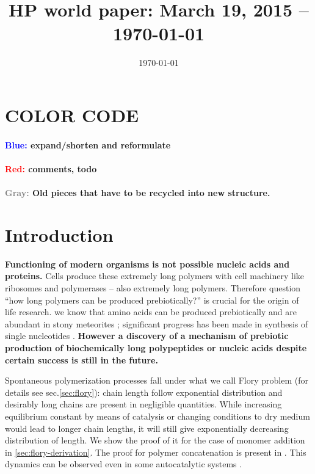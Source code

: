 \documentclass[12pt]{paper}
\title{HP world paper: March 19, 2015 -- \today}
\author{}
\date{\today}
\newcommand{\red}[1]{\textcolor{red}{#1}}
\newcommand{\gray}[1]{\textcolor{gray}{#1}}
\begin{document}
 \maketitle
 \tableofcontents
 
 \section*{COLOR CODE}
\paragraph{\textcolor{blue}{Blue: } expand/shorten and reformulate}
\paragraph{\red{Red: }comments, todo}
\paragraph{\gray{Gray: }Old pieces that have to be recycled into new structure.}
 
\section{Introduction} 

\textbf{Functioning of modern organisms is not possible nucleic 
acids and proteins.} Cells produce these extremely long polymers with cell machinery 
like ribosomes and polymerases -- also extremely long polymers. 
Therefore question ``how long 
polymers can be produced prebiotically?'' is crucial for the origin of life research.
we know that amino acids can be produced prebiotically \cite{Miller1953} and are abundant in 
stony meteorites \cite{Sephton2002}; significant progress has been made in synthesis of 
single nucleotides \cite{Powner2009a}. \textbf{However a discovery of a mechanism of prebiotic 
production of biochemically 
long polypeptides or nucleic acids despite certain success 
\cite{Shock1992,Martin1998,PAECHT-HOROWITZ1970,Lambert2008,Leman2004a,Orgel2004,Ferris1996} is 
still in the future.}

Spontaneous polymerization processes fall under what we call Flory problem (for details see 
sec.\ref{sec:flory}): chain length follow exponential distribution and desirably long chains are 
present in negligible quantities. While increasing equilibrium constant by means of catalysis or 
changing conditions to dry medium would lead to longer chain lengths, it will still give 
exponentially decreasing distribution of length. We show the proof of it for the case of monomer 
addition in \ref{sec:flory-derivation}. The proof for polymer concatenation is present in 
\cite{Derr2012}. This dynamics can be observed even in some autocatalytic systems \cite{Wu2009}.
\end{document}
